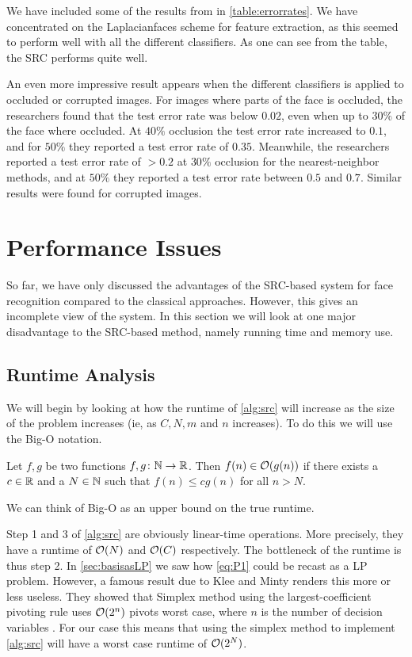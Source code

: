 We have included some of the results from \cite{wright09facerecog} in \cref{table:errorrates}. We have concentrated on the Laplacianfaces scheme for feature extraction, as this seemed to perform well with all the different classifiers. As one can see from the table, the SRC performs quite well. 

An even more impressive result appears when the different classifiers is applied to occluded or corrupted images. For images where parts of the face is occluded, the researchers found that the test error rate was below $ 0.02 $, even when up to $ 30\% $ of the face where occluded. At $ 40\% $ occlusion the test error rate increased to $ 0.1 $, and for $ 50\% $ they reported a test error rate of $ 0.35 $. Meanwhile, the researchers reported a test error rate of $ > 0.2 $ at $ 30\% $ occlusion for the nearest-neighbor methods, and at $ 50\% $ they reported a test error rate between $ 0.5 $ and $ 0.7 $. Similar results were found for corrupted images. 




\section{Performance Issues}
So far, we have only discussed the advantages of the SRC-based system for face recognition compared to the classical approaches. However, this gives an incomplete view of the system. In this section we will look at one major disadvantage to the SRC-based method, namely running time and memory use. 

\subsection{Runtime Analysis}
We will begin by looking at how the runtime of \cref{alg:src} will increase as the size of the problem increases (ie, as $ C, N, m $ and $ n $ increases). To do this we will use the Big-O notation.
\begin{definition}
	Let $ f, g $ be two functions $ f, g\colon\mathbb{N}\to\mathbb{R} $. Then $ f(n) \in \mathcal{O}(g(n)) $ if there exists a $ c \in \mathbb{R} $ and a $ N \in \mathbb{N} $ such that $ f(n) \leq cg(n) $ for all $ n > N $.
\end{definition}
\noindent We can think of Big-O as an upper bound on the true runtime.

Step 1 and 3 of \cref{alg:src} are obviously linear-time operations. More precisely, they have a runtime of  $ \mathcal{O}(N) $ and $ \mathcal{O}(C) $ respectively. The bottleneck of the runtime is thus step 2. In \cref{sec:basisasLP} we saw how \eqref{eq:P1} could be recast as a LP problem. However, a famous result due to Klee and Minty renders this more or less useless. They showed that Simplex method using the largest-coefficient pivoting rule uses $ \mathcal{O}(2^{n}) $ pivots worst case, where $ n $ is the number of decision variables \cite[Section~4.4]{vanderbei14linprog}. For our case this means that using the simplex method to implement \cref{alg:src} will have a worst case runtime of $ \mathcal{O}(2^{N}) $.

